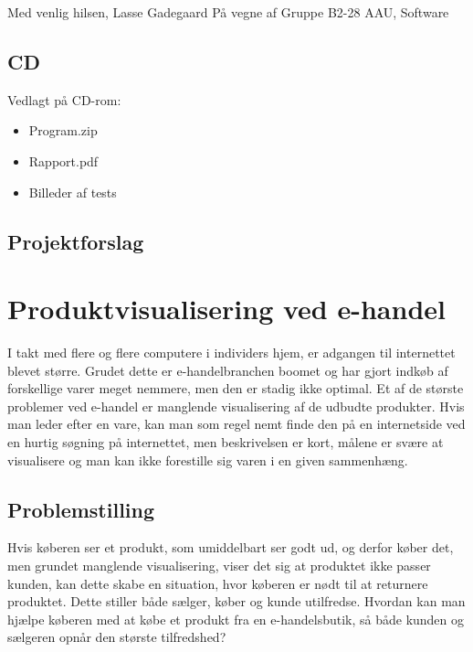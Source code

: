 Med venlig hilsen,\newline
Lasse Gadegaard\newline
På vegne af\newline
Gruppe B2-28\newline
AAU, Software

\clearpage
\subsection{CD}
\label{sec:cd_bilag}
Vedlagt på CD-rom:

\begin{itemize}
  \item Program.zip
  \item Rapport.pdf
  \item Billeder af tests
\end{itemize}

\clearpage
\subsection{Projektforslag}
\section*{Produktvisualisering ved e-handel}
I takt med flere og flere computere i individers hjem, er adgangen til internettet blevet større. Grudet dette er e-handelbranchen boomet og har gjort indkøb af forskellige varer meget nemmere, men den er stadig ikke optimal. Et af de største problemer ved e-handel er manglende visualisering af de udbudte produkter. Hvis man leder efter en vare, kan man som regel nemt finde den på en internetside ved en hurtig søgning på internettet, men beskrivelsen er kort, målene er svære at visualisere og man kan ikke forestille sig varen i en given sammenhæng.

\subsection*{Problemstilling}
Hvis køberen ser et produkt, som umiddelbart ser godt ud, og derfor køber det, men grundet manglende visualisering, viser det sig at produktet ikke passer kunden, kan dette skabe en situation, hvor køberen er nødt til at returnere produktet. Dette stiller både sælger, køber og kunde utilfredse. Hvordan kan man hjælpe køberen med at købe et produkt fra en e-handelsbutik, så både kunden og sælgeren opnår den største tilfredshed?

